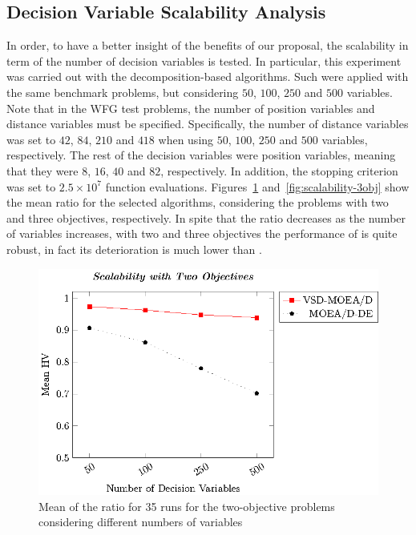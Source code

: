 \subsection{Decision Variable Scalability Analysis}

In order, to have a better insight of the benefits of our proposal, the scalability in term of the number of decision variables is tested.
%
In particular, this experiment was carried out with the decomposition-based algorithms.
%
Such \MOEAS{} were applied with the same benchmark problems, but considering $50$, $100$, $250$ and $500$ variables.
%
Note that in the WFG test problems, the number of position variables and distance variables must be specified.
%
Specifically, the number of distance variables was set to $42$, $84$, $210$ and $418$ when using $50$, $100$, $250$ and $500$ variables, respectively.
%
The rest of the decision variables were position variables, meaning that they were $8$, $16$, $40$ and $82$, respectively.
%
In addition, the stopping criterion was set to $2.5 \times 10^7$ function evaluations.
%
Figures~\ref{fig:scalability-2obj} and~\ref{fig:scalability-3obj} show the mean \HV{} ratio for the selected algorithms, considering the problems with two and three objectives, respectively.
%
In spite that the \HV{} ratio decreases as the number of variables increases, with two and three objectives the performance of \VSDMOEAD{} is quite robust, in fact its deterioration is much lower than \MOEADDE{}.
%

\begin{figure}[t]
\centering
\includegraphics[scale=0.85]{images/Graphic-Scalability-2obj_tikz-figure0.eps}
\caption{Mean of the \HV{} ratio for 35 runs for the two-objective problems considering different numbers of variables}\label{fig:scalability-2obj}
\end{figure}

